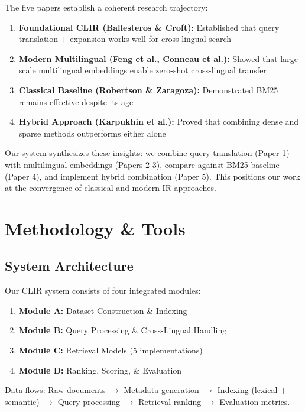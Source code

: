 \documentclass[12pt,a4paper]{report}
\begin{document}
The five papers establish a coherent research trajectory:

\begin{enumerate}
    \item \textbf{Foundational CLIR (Ballesteros \& Croft):} Established that query translation + expansion works well for cross-lingual search
    \item \textbf{Modern Multilingual (Feng et al., Conneau et al.):} Showed that large-scale multilingual embeddings enable zero-shot cross-lingual transfer
    \item \textbf{Classical Baseline (Robertson \& Zaragoza):} Demonstrated BM25 remains effective despite its age
    \item \textbf{Hybrid Approach (Karpukhin et al.):} Proved that combining dense and sparse methods outperforms either alone
\end{enumerate}

Our system synthesizes these insights: we combine query translation (Paper 1) with multilingual embeddings (Papers 2-3), compare against BM25 baseline (Paper 4), and implement hybrid combination (Paper 5). This positions our work at the convergence of classical and modern IR approaches.

\newpage

\chapter{Methodology \& Tools}

\section{System Architecture}

Our CLIR system consists of four integrated modules:

\begin{enumerate}
    \item \textbf{Module A:} Dataset Construction \& Indexing
    \item \textbf{Module B:} Query Processing \& Cross-Lingual Handling
    \item \textbf{Module C:} Retrieval Models (5 implementations)
    \item \textbf{Module D:} Ranking, Scoring, \& Evaluation
\end{enumerate}

Data flows: Raw documents $\rightarrow$ Metadata generation $\rightarrow$ Indexing (lexical + semantic) $\rightarrow$ Query processing $\rightarrow$ Retrieval ranking $\rightarrow$ Evaluation metrics.
\end{document}
